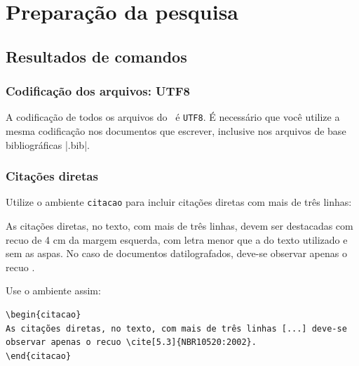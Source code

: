 \part{Preparação da pesquisa}

\chapter{Resultados de comandos}
\label{cap_exemplos}


\section{Codificação dos arquivos: UTF8}

A codificação de todos os arquivos do \abnTeX\ é \texttt{UTF8}. É necessário que
você utilize a mesma codificação nos documentos que escrever, inclusive nos
arquivos de base bibliográficas |.bib|.

\section{Citações diretas}
\label{sec-citacao}

Utilize o ambiente \texttt{citacao} para incluir
citações diretas com mais de três linhas:

\begin{citacao}
As citações diretas, no texto, com mais de três linhas, devem ser
destacadas com recuo de 4 cm da margem esquerda, com letra menor que a do texto
utilizado e sem as aspas. No caso de documentos datilografados, deve-se
observar apenas o recuo \cite[5.3]{NBR10520:2002}.
\end{citacao}

Use o ambiente assim:
\begin{verbatim}
\begin{citacao}
As citações diretas, no texto, com mais de três linhas [...] deve-se
observar apenas o recuo \cite[5.3]{NBR10520:2002}.
\end{citacao}
\end{verbatim}

